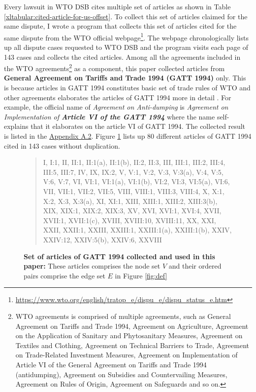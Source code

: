 Every lawsuit in WTO DSB
cites multiple set of articles
as shown in Table
\ref{xltabular:cited-article-for-us-offset}.
To collect this set of articles claimed for the same dispute, I wrote a program that collects this set of articles cited for the same dispute from the WTO official webpage\footnote{\url{https://www.wto.org/english/tratop_e/dispu_e/dispu_status_e.htm}}.
The webpage chronologically lists up all dispute cases
requested to WTO DSB and the program visits each page of 143 cases
and collects the cited articles. Among all the agreements included in the WTO agreements\footnote{
   WTO agreements is comprised of multiple agreements, such as
   General Agreement on Tariffs and Trade 1994,
   Agreement on Agriculture,
   Agreement on the Application of Sanitary and Phytosanitary Measures,
   Agreement on Textiles and Clothing,
   Agreement on Technical Barriers to Trade,
   Agreement on Trade-Related Investment Measures,
   Agreement on Implementation of Article VI of the General Agreement on Tariffs and Trade 1994 (antidumping),
   Agreement on Subsidies and Countervailing Measures,
   Agreement on Rules of Origin,
   Agreement on Safeguards and so on.
   } as a component,
this paper collected articles from \textbf{General Agreement on Tariffs and Trade 1994 (GATT 1994)} only.
This is because articles in GATT 1994 constitutes basic set of trade rules of WTO and other agreements
elaborates the articles of GATT 1994 more in detail \citep{world1999wto}. For example, the official name of \textit{Agreement on Anti-dumping}
is \textit{Agreement on Implementation of \textbf{Article VI of the GATT 1994}}
where the name self-explains that it elaborates on the article VI of GATT 1994.
The collected result is listed in the \hyperref[sub:cited-articles-table]{Appendix A.2}. Figure \ref{fig:set-of-articles-used}
lists up 80 different articles of GATT 1994 cited in 143 cases without duplication.
 
 
\begin{figure}[h]
   \begin{quote}
   I,
   I:1,
   II,
   II:1,
   II:1(a),
   II:1(b),
   II:2,
   II:3,
   III,
   III:1,
   III:2,
   III:4,
   III:5,
   III:7,
   IV,
   IX,
   IX:2,
   V,
   V:1,
   V:2,
   V:3,
   V:3(a),
   V:4,
   V:5,
   V:6,
   V:7,
   VI,
   VI:1,
   VI:1(a),
   VI:1(b),
   VI:2,
   VI:3,
   VI:5(a),
   VI:6,
   VII,
   VII:1,
   VII:2,
   VII:5,
   VIII,
   VIII:1,
   VIII:3,
   VIII:4,
   X,
   X:1,
   X:2,
   X:3,
   X:3(a),
   XI,
   XI:1,
   XIII,
   XIII:1,
   XIII:2,
   XIII:3(b),
   XIX,
   XIX:1,
   XIX:2,
   XIX:3,
   XV,
   XVI,
   XVI:1,
   XVI:4,
   XVII,
   XVII:1,
   XVII:1(c),
   XVIII,
   XVIII:10,
   XVIII:11,
   XX,
   XXI,
   XXII,
   XXII:1,
   XXIII,
   XXIII:1,
   XXIII:1(a),
   XXIII:1(b),
   XXIV,
   XXIV:12,
   XXIV:5(b),
   XXIV:6,
   XXVIII
   \end{quote}
   \caption{
       \textbf{
           Set of articles of GATT 1994 collected and used in this paper:
           }These articles comprises the node set $V$ and their ordered pairs comprise the edge set $E$ in Figure \ref{fig:def}
       }
   \label{fig:set-of-articles-used}
\end{figure}
 
